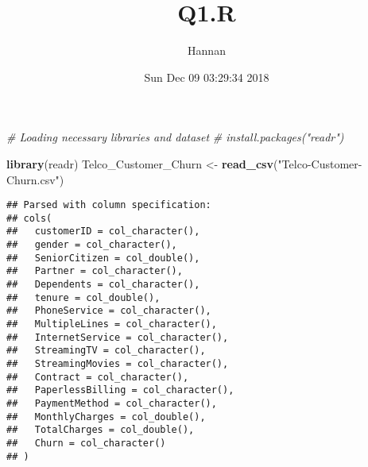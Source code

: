 \documentclass[]{article}
\title{Q1.R}
\author{Hannan}
\date{Sun Dec 09 03:29:34 2018}
\newenvironment{Shaded}{\begin{snugshade}}{\end{snugshade}}
\newcommand{\KeywordTok}[1]{\textcolor[rgb]{0.13,0.29,0.53}{\textbf{#1}}}
\newcommand{\DataTypeTok}[1]{\textcolor[rgb]{0.13,0.29,0.53}{#1}}
\newcommand{\DecValTok}[1]{\textcolor[rgb]{0.00,0.00,0.81}{#1}}
\newcommand{\CharTok}[1]{\textcolor[rgb]{0.31,0.60,0.02}{#1}}
\newcommand{\StringTok}[1]{\textcolor[rgb]{0.31,0.60,0.02}{#1}}
\newcommand{\CommentTok}[1]{\textcolor[rgb]{0.56,0.35,0.01}{\textit{#1}}}
\newcommand{\OperatorTok}[1]{\textcolor[rgb]{0.81,0.36,0.00}{\textbf{#1}}}
\newcommand{\NormalTok}[1]{#1}
\begin{document}
\maketitle

\begin{Shaded}
\begin{Highlighting}[]
\CommentTok{# Loading necessary libraries and dataset}
\CommentTok{# install.packages("readr")}
    
    \KeywordTok{library}\NormalTok{(readr)}
\NormalTok{    Telco_Customer_Churn <-}\StringTok{ }\KeywordTok{read_csv}\NormalTok{(}\StringTok{"Telco-Customer-Churn.csv"}\NormalTok{)}
\end{Highlighting}
\end{Shaded}

\begin{verbatim}
## Parsed with column specification:
## cols(
##   customerID = col_character(),
##   gender = col_character(),
##   SeniorCitizen = col_double(),
##   Partner = col_character(),
##   Dependents = col_character(),
##   tenure = col_double(),
##   PhoneService = col_character(),
##   MultipleLines = col_character(),
##   InternetService = col_character(),
##   StreamingTV = col_character(),
##   StreamingMovies = col_character(),
##   Contract = col_character(),
##   PaperlessBilling = col_character(),
##   PaymentMethod = col_character(),
##   MonthlyCharges = col_double(),
##   TotalCharges = col_double(),
##   Churn = col_character()
## )
\end{verbatim}

\begin{Shaded}
\end{Shaded}
\end{document}
